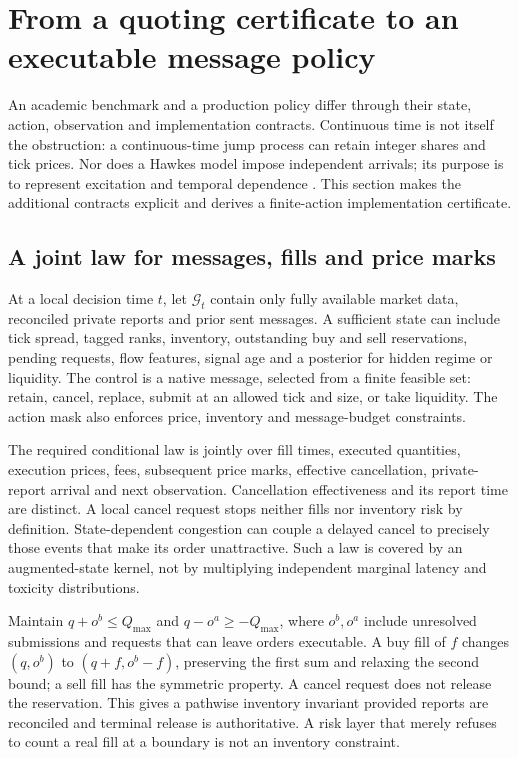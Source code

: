 \section{From a quoting certificate to an executable message policy}
\label{sec:productionquoting}

An academic benchmark and a production policy differ through their state,
action, observation and implementation contracts. Continuous time is not
itself the obstruction: a continuous-time jump process can retain integer
shares and tick prices. Nor does a Hawkes model impose independent arrivals;
its purpose is to represent excitation and temporal dependence
\citep{DeployBacry2015}. This section makes the additional contracts explicit
and derives a finite-action implementation certificate.

\subsection{A joint law for messages, fills and price marks}

At a local decision time $t$, let $\mathcal G_t$ contain only fully available
market data, reconciled private reports and prior sent messages. A sufficient
state can include tick spread, tagged ranks, inventory, outstanding buy and
sell reservations, pending requests, flow features, signal age and a posterior
for hidden regime or liquidity. The control is a native message, selected
from a finite feasible set: retain, cancel, replace, submit at an allowed
tick and size, or take liquidity. The action mask also enforces price,
inventory and message-budget constraints.

The required conditional law is jointly over fill times, executed quantities,
execution prices, fees, subsequent price marks, effective cancellation,
private-report arrival and next observation. Cancellation effectiveness and
its report time are distinct. A local cancel request stops neither fills nor
inventory risk by definition. State-dependent congestion can couple a delayed
cancel to precisely those events that make its order unattractive. Such a law
is covered by an augmented-state kernel, not by multiplying independent
marginal latency and toxicity distributions.

Maintain $q+o^b\le Q_{\max}$ and $q-o^a\ge-Q_{\max}$, where $o^b,o^a$
include unresolved submissions and requests that can leave orders executable.
A buy fill of $f$ changes $(q,o^b)$ to $(q+f,o^b-f)$, preserving the first
sum and relaxing the second bound; a sell fill has the symmetric property.
A cancel request does not release the reservation. This gives a pathwise
inventory invariant provided reports are reconciled and terminal release is
authoritative. A risk layer that merely refuses to count a real fill at a
boundary is not an inventory constraint.


